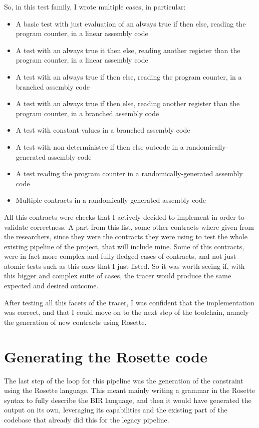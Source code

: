So, in this test family, I wrote multiple cases, in particular:
\begin{itemize}
  \item A basic test with just evaluation of an always true if then else,
    reading the program counter, in a linear assembly code

  \item A test with an always true it then else, reading another register than
    the program counter, in a linear assembly code

  \item A test with an always true if then else, reading the program counter, in
    a branched assembly code

  \item A test with an always true if then else, reading another register than
    the program counter, in a branched assembly code

  \item A test with constant values in a branched assembly code

  \item A test with non deterministec if then else outcode in a randomically-generated
    assembly code

  \item A test reading the program counter in a randomically-generated assembly code

  \item Multiple contracts in a randomically-generated assembly code
\end{itemize}

All this contracts were checks that I actively decided to implement in order to
validate correctness. A part from this list, some other contracts where given
from the researchers, since they were the contracts they were using to test the whole
existing pipeline of the project, that will include mine. Some of this contracts,
were in fact more complex and fully fledged cases of contracts, and not just atomic
tests such as this ones that I just listed. So it was worth seeing if, with this
bigger and complex suite of cases, the tracer would produce the same expected
and desired outcome.

After testing all this facets of the tracer, I was confident that the implementation
was correct, and that I could move on to the next step of the toolchain, namely the
generation of new contracts using Rosette.

\section{Generating the Rosette code}
\label{cha:Generating the Rosette code} The last step of the loop for this pipeline
was the generation of the constraint using the Rosette language. This meant
mainly writing a grammar in the Rosette syntax to fully describe the BIR
language, and then it would have generated the output on its own, leveraging its
capabilities and the existing part of the codebase that already did this for the
legacy pipeline.

